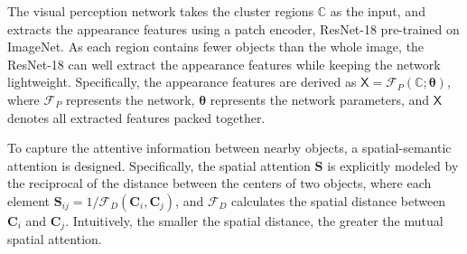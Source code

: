 \documentclass[letterpaper]{article} %
\def \eg {\emph{e.g.}}
\newcommand\red[1]{\textcolor{red}{#1}}
\newcommand\blue[1]{\textcolor{blue}{#1}}
\newcommand\rjf[1]{\textcolor{red}{\{RJF: #1\}}}
\newcommand\qz[1]{\textcolor{blue}{\{QZ: #1\}}}
\begin{document}
The visual perception network takes the cluster regions $\mathbb{C}$ as the input, and extracts the appearance features using a patch encoder, ResNet-18 pre-trained on ImageNet. As each region contains fewer objects than the whole image, %
the ResNet-18 can well extract the appearance features while keeping the network lightweight.
Specifically, %
the appearance features are derived as $\bm{\mathsf{X}} = \mathcal{F}_{P}\left(\mathbb{C}; \bm{\theta}\right)$, where $\mathcal{F}_P$ represents the network, $\bm{\theta}$ represents the network parameters, and $\bm{\mathsf{X}}$ denotes all extracted features packed together.

To capture the attentive information between nearby objects, a spatial-semantic attention is designed. Specifically,
the spatial attention $\bm{S}$ is explicitly modeled by the reciprocal of the distance between the centers of two objects, %
where each element %
$\bm{S}_{ij} = 1/\mathcal{F}_{D}(\bm{C}_i, \bm{C}_j)$, and $\mathcal{F}_{D}$ calculates the spatial distance between $\bm{C}_i$ and $\bm{C}_j$. %
Intuitively, the smaller the spatial distance, the greater the mutual spatial attention. %




\end{document}
